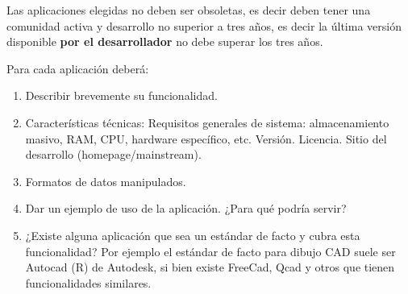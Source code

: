 \documentclass[12pt]{article}
\begin{document}
Las aplicaciones elegidas no deben ser obsoletas, es decir deben
tener una comunidad activa y desarrollo no superior a tres años, 
es decir la última versión disponible {\bf por el desarrollador}
no debe superar los tres años. 

Para cada aplicación deberá:
\begin{enumerate}
\item Describir brevemente su funcionalidad. 
\item Características técnicas: Requisitos generales 
de sistema: almacenamiento masivo, RAM, CPU, hardware específico, etc. 
Versión. Licencia. Sitio del desarrollo (homepage/mainstream). 
\item Formatos de datos manipulados. 
\item Dar un ejemplo de uso de la aplicación. ¿Para qué podría servir? 
\item ¿Existe alguna aplicación que sea un estándar de facto y cubra esta
funcionalidad? Por ejemplo el estándar de facto para dibujo CAD suele ser
Autocad (R) de Autodesk, si bien existe FreeCad, Qcad y otros que tienen
funcionalidades similares. 
\end{enumerate}
\end{document}
